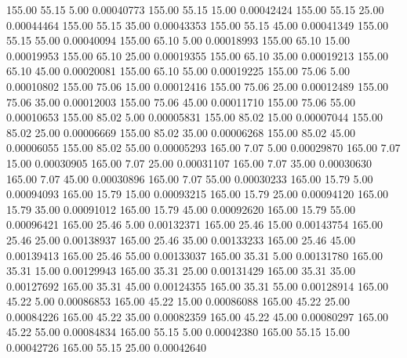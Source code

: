     155.00     55.15      5.00     0.00040773
    155.00     55.15     15.00     0.00042424
    155.00     55.15     25.00     0.00044464
    155.00     55.15     35.00     0.00043353
    155.00     55.15     45.00     0.00041349
    155.00     55.15     55.00     0.00040094
    155.00     65.10      5.00     0.00018993
    155.00     65.10     15.00     0.00019953
    155.00     65.10     25.00     0.00019355
    155.00     65.10     35.00     0.00019213
    155.00     65.10     45.00     0.00020081
    155.00     65.10     55.00     0.00019225
    155.00     75.06      5.00     0.00010802
    155.00     75.06     15.00     0.00012416
    155.00     75.06     25.00     0.00012489
    155.00     75.06     35.00     0.00012003
    155.00     75.06     45.00     0.00011710
    155.00     75.06     55.00     0.00010653
    155.00     85.02      5.00     0.00005831
    155.00     85.02     15.00     0.00007044
    155.00     85.02     25.00     0.00006669
    155.00     85.02     35.00     0.00006268
    155.00     85.02     45.00     0.00006055
    155.00     85.02     55.00     0.00005293
    165.00      7.07      5.00     0.00029870
    165.00      7.07     15.00     0.00030905
    165.00      7.07     25.00     0.00031107
    165.00      7.07     35.00     0.00030630
    165.00      7.07     45.00     0.00030896
    165.00      7.07     55.00     0.00030233
    165.00     15.79      5.00     0.00094093
    165.00     15.79     15.00     0.00093215
    165.00     15.79     25.00     0.00094120
    165.00     15.79     35.00     0.00091012
    165.00     15.79     45.00     0.00092620
    165.00     15.79     55.00     0.00096421
    165.00     25.46      5.00     0.00132371
    165.00     25.46     15.00     0.00143754
    165.00     25.46     25.00     0.00138937
    165.00     25.46     35.00     0.00133233
    165.00     25.46     45.00     0.00139413
    165.00     25.46     55.00     0.00133037
    165.00     35.31      5.00     0.00131780
    165.00     35.31     15.00     0.00129943
    165.00     35.31     25.00     0.00131429
    165.00     35.31     35.00     0.00127692
    165.00     35.31     45.00     0.00124355
    165.00     35.31     55.00     0.00128914
    165.00     45.22      5.00     0.00086853
    165.00     45.22     15.00     0.00086088
    165.00     45.22     25.00     0.00084226
    165.00     45.22     35.00     0.00082359
    165.00     45.22     45.00     0.00080297
    165.00     45.22     55.00     0.00084834
    165.00     55.15      5.00     0.00042380
    165.00     55.15     15.00     0.00042726
    165.00     55.15     25.00     0.00042640
